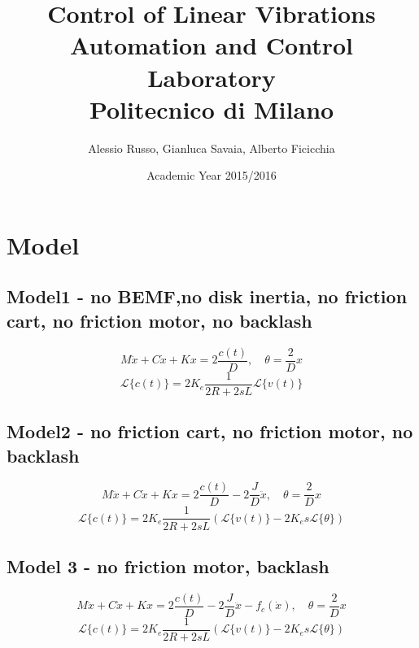 \documentclass[10pt,a4paper]{report}
\author{Alessio Russo, Gianluca Savaia, Alberto Ficicchia}
\title{Control of Linear Vibrations \\
\Large Automation and Control Laboratory \\
 Politecnico di Milano}
\date{Academic Year 2015/2016}
\begin{document}
\maketitle
\tableofcontents
\chapter{Model}
\section{Model1 - no BEMF,no disk inertia, no friction cart, no friction motor, no backlash}
$$M\ddot{x} + C\dot{x}+Kx = 2\frac{c(t)}{D}, \quad \theta = \frac{2}{D}x$$
$$\mathcal{L}\{c(t)\} = 2K_e \frac{1}{2R+2sL} \mathcal{L}\{ v(t)\}$$

\section{Model2 - no friction cart, no friction motor, no backlash}
$$M\ddot{x} + C\dot{x}+Kx = 2\frac{c(t)}{D}  - 2\frac{J}{D}\ddot{x}, \quad \theta = \frac{2}{D}x$$
$$\mathcal{L}\{c(t)\} = 2K_e \frac{1}{2R+2sL} (\mathcal{L}\{ v(t)\}-2K_e s \mathcal{L}\{\theta \})$$


\section{Model 3 - no friction motor, backlash}
$$M\ddot{x} + C\dot{x}+Kx = 2\frac{c(t)}{D} - 2\frac{J}{D}\ddot{x} - f_c(\dot{x}), \quad \theta = \frac{2}{D}x$$
$$\mathcal{L}\{c(t)\} = 2K_e \frac{1}{2R+2sL} (\mathcal{L}\{ v(t)\}-2K_e s \mathcal{L}\{\theta \})$$
\end{document}
